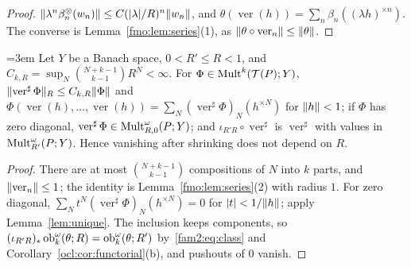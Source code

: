 \begin{proof}
$\lVert \lambda^n\beta^\otimes_n(w_n)\rVert\le C(\lvert \lambda\rvert/R)^n\lVert w_n\rVert$, and $\theta(\operatorname{ver}(h))=\sum_n\beta_n
((\lambda h)^{\times n})$. The converse is Lemma~\ref{fmo:lem:series}(1), as $\lVert \theta\circ\operatorname{ver}_n\rVert\le
\lVert \theta\rVert$.
\end{proof}

\begin{lemma}\label{fmo:lem:veronese}\emergencystretch=3em
Let $Y$ be a Banach space, $0<R'\le R<1$, and $C_{k,R}=\sup_N\binom{N+k-1}{k-1}R^N<\infty$. For
$\Phi\in\operatorname{Mult}^k(\mathcal T(P);Y)$, $\lVert \operatorname{ver}^\sharp\Phi\rVert_R\le C_{k,R}\lVert \Phi\rVert$ and
$\Phi(\operatorname{ver}(h),\dots,\operatorname{ver}(h))=\sum_N(\operatorname{ver}^\sharp\Phi)_N(h^{\times N})$ for
$\lVert h\rVert<1$; if $\Phi$ has zero diagonal, $\operatorname{ver}^\sharp\Phi\in\operatorname{Mult}^\omega_{R,0}(P;Y)$; and
$\iota_{R'R}\circ\operatorname{ver}^\sharp$ is $\operatorname{ver}^\sharp$ with values in $\operatorname{Mult}^\omega_{R'}(P;Y)$. Hence
vanishing after shrinking does not depend on $R$.
\end{lemma}

\begin{proof}
There are at most $\binom{N+k-1}{k-1}$ compositions of $N$ into $k$ parts, and $\lVert \operatorname{ver}_n\rVert\le1$; the identity
is Lemma~\ref{fmo:lem:series}(2) with radius $1$. For zero diagonal, $\sum_Nt^N(\operatorname{ver}^\sharp\Phi)_N(h^{\times N})=0$
for $\lvert t\rvert<1/\lVert h\rVert$; apply Lemma~\ref{lem:unique}. The inclusion keeps components, so $(\iota_{R'R})_*\operatorname{ob}^\omega_k(\theta;R)=
\operatorname{ob}^\omega_k(\theta;R')$ by~\eqref{fam2:eq:class} and Corollary~\ref{ocl:cor:functorial}(b), and pushouts of $0$ vanish.
\end{proof}

